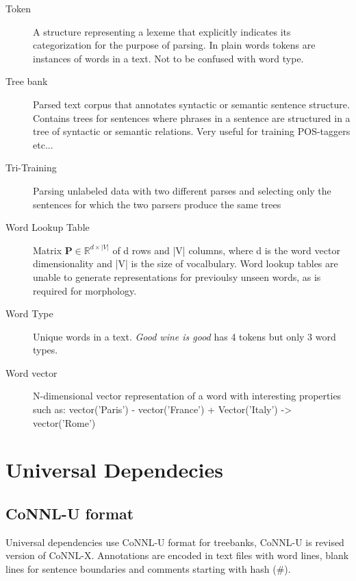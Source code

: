 \documentclass[12pt,a4paper,english
]{tutthesis}
\begin{document}
\begin{description}
\item[Token] A structure representing a lexeme that explicitly indicates its categorization for the purpose of parsing. In plain words tokens are instances of words in a text. Not to be confused with word type.

\item[Tree bank] Parsed text corpus that annotates syntactic or semantic sentence structure. Contains trees for sentences where phrases in a sentence are structured in a tree of syntactic or semantic relations. Very useful for training POS-taggers etc...

\item[Tri-Training] Parsing unlabeled data with two different parses and selecting only the sentences for which the two parsers produce the same trees \cite{Weiss2015}

\item[Word Lookup Table] Matrix $\textbf{P} \in \mathbb{R}^{d \times |V|}$ of d rows and |V| columns, where d is the word vector dimensionality and |V| is the size of vocalbulary. Word lookup tables are unable to generate representations for previoulsy unseen words, as is required for morphology. \cite{Ling2015}

\item[Word Type] Unique words in a text. \textit{Good wine is good} has 4 tokens but only 3 word types.

\item[Word vector] N-dimensional vector representation of a word with interesting properties such as: vector('Paris') - vector('France') + Vector('Italy') -> vector('Rome')
\end{description}

\section{Universal Dependecies}

\subsection{CoNNL-U format}
Universal dependencies use CoNNL-U format for treebanks, CoNNL-U is revised version of CoNNL-X. Annotations are encoded in text files with word lines, blank lines for sentence boundaries and comments starting with hash (\#).
\end{document}
